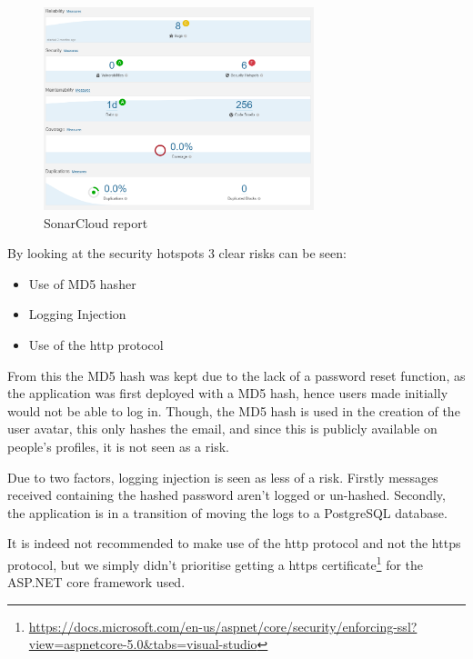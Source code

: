 \documentclass[report/main.tex]{subfiles}
\begin{document}
        \begin{figure}[H]
            \centering
            \includegraphics[width=0.7\textwidth]{report/images/SonarCloud Report.png}
            \caption{SonarCloud report}
            \label{fig:sonarcloud}
        \end{figure}
        
        By looking at the security hotspots 3 clear risks can be seen:
        
        \begin{itemize}
            \item Use of MD5 hasher
            \item Logging Injection
            \item Use of the http protocol
        \end{itemize}
        
        From this the MD5 hash was kept due to the lack of a password reset function, as the application was first deployed with a MD5 hash, hence users made initially would not be able to log in. Though, the MD5 hash is used in the creation of the user avatar, this only hashes the email, and since this is publicly available on people's profiles, it is not seen as a risk.
        
        Due to two factors, logging injection is seen as less of a risk. Firstly messages received containing the hashed password aren't logged or un-hashed. Secondly, the application is in a transition of moving the logs to a PostgreSQL database.
        
        It is indeed not recommended to make use of the http protocol and not the https protocol, but we simply didn't prioritise getting a https certificate\footnote{\hyperlink{https certificate for ASP.NET core}{https://docs.microsoft.com/en-us/aspnet/core/security/enforcing-ssl?view=aspnetcore-5.0\&tabs=visual-studio}} for the ASP.NET core framework used.
        
\end{document}
